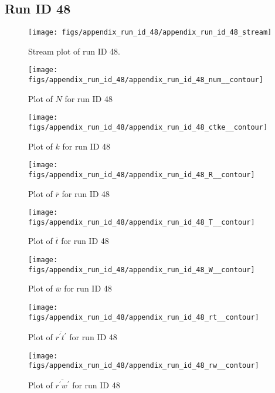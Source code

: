 \subsection{Run ID 48}
\begin{figure}[H]
\centering
\texttt{[image: figs/appendix\_run\_id\_48/appendix\_run\_id\_48\_stream]}
\caption{Stream plot of run ID 48.}
\label{fig:appendix_run_id_48_stream}
\end{figure}


\begin{figure}[H]
\centering
\texttt{[image: figs/appendix\_run\_id\_48/appendix\_run\_id\_48\_num\_\_contour]}
\caption{Plot of $N$ for run ID 48}
\label{fig:appendix_run_id_48_num__contour}
\end{figure}


\begin{figure}[H]
\centering
\texttt{[image: figs/appendix\_run\_id\_48/appendix\_run\_id\_48\_ctke\_\_contour]}
\caption{Plot of $k$ for run ID 48}
\label{fig:appendix_run_id_48_ctke__contour}
\end{figure}


\begin{figure}[H]
\centering
\texttt{[image: figs/appendix\_run\_id\_48/appendix\_run\_id\_48\_R\_\_contour]}
\caption{Plot of $\overline{r}$ for run ID 48}
\label{fig:appendix_run_id_48_R__contour}
\end{figure}


\begin{figure}[H]
\centering
\texttt{[image: figs/appendix\_run\_id\_48/appendix\_run\_id\_48\_T\_\_contour]}
\caption{Plot of $\overline{t}$ for run ID 48}
\label{fig:appendix_run_id_48_T__contour}
\end{figure}


\begin{figure}[H]
\centering
\texttt{[image: figs/appendix\_run\_id\_48/appendix\_run\_id\_48\_W\_\_contour]}
\caption{Plot of $\overline{w}$ for run ID 48}
\label{fig:appendix_run_id_48_W__contour}
\end{figure}


\begin{figure}[H]
\centering
\texttt{[image: figs/appendix\_run\_id\_48/appendix\_run\_id\_48\_rt\_\_contour]}
\caption{Plot of $\overline{r^\prime t^\prime}$ for run ID 48}
\label{fig:appendix_run_id_48_rt__contour}
\end{figure}


\begin{figure}[H]
\centering
\texttt{[image: figs/appendix\_run\_id\_48/appendix\_run\_id\_48\_rw\_\_contour]}
\caption{Plot of $\overline{r^\prime w^\prime}$ for run ID 48}
\label{fig:appendix_run_id_48_rw__contour}
\end{figure}


